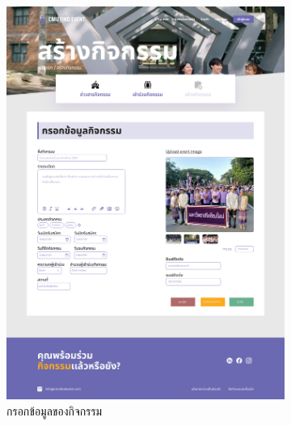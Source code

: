 \begin{figure}[h]
  \centering
  \begin{subfigure}[b]{0.3\linewidth}
    \includegraphics[width=\linewidth]{image/Figma-design/Create-event-info.png}
    \caption{กรอกข้อมูลของกิจกรรม}
  \end{subfigure}
  \hfill
  \begin{subfigure}[b]{0.3\linewidth}

\end{subfigure}
\end{figure}
